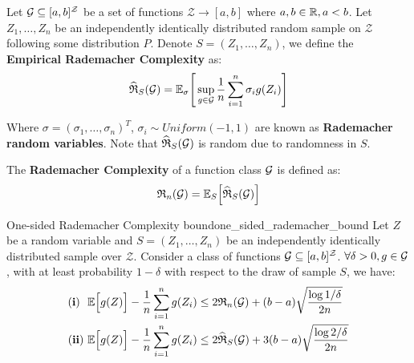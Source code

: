 \begin{definition}
    Let $\mathcal{G}\subseteq[a,b]^{\mathcal{Z}}$ be a set of functions $\mathcal{Z} \to [a, b]$ where $a,b\in\mathbb{R}, a < b$. Let $Z_1, \dots, Z_n$ be an independently identically distributed random sample on $\mathcal{Z}$ following some distribution $P$. Denote $S=(Z_1, \dots, Z_n)$, we define the \textbf{Empirical Rademacher Complexity} as:
    \begin{align*}
        \widehat{\mathfrak{R}}_S(\mathcal{G}) = \mathbb{E}_\sigma\Bigg[ 
            \sup_{g\in\mathcal{G}} \frac{1}{n}\sum_{i=1}^n \sigma_i g(Z_i)
         \Bigg]
    \end{align*}

    \noindent Where $\sigma=(\sigma_1, \dots, \sigma_n)^T$, $\sigma_i\sim Uniform(-1, 1)$ are known as \textbf{Rademacher random variables}. Note that $\widehat{\mathfrak{R}}_S(\mathcal{G})$ is random due to randomness in $S$.
\end{definition}

\begin{definition}
    The \textbf{Rademacher Complexity} of a function class $\mathcal{G}$ is defined as:
    \begin{align*}
        \mathfrak{R}_n(\mathcal{G}) = \mathbb{E}_S\Big[  \widehat{\mathfrak{R}}_S(\mathcal{G})  \Big]
    \end{align*}
\end{definition}

\begin{theorem}{One-sided Rademacher Complexity bound}{one_sided_rademacher_bound}
    Let $Z$ be a random variable and $S=(Z_1, \dots, Z_n)$ be an independently identically distributed sample over $\mathcal{Z}$. Consider a class of functions $\mathcal{G}\subseteq [a,b]^\mathcal{Z}$. $\forall \delta > 0, g\in\mathcal{G}$, with at least probability $1-\delta$ with respect to the draw of sample $S$, we have:
    \begin{align*}
        {\bf (i)} \ \ \mathbb{E}\Big[ g(Z) \Big] - \frac{1}{n} \sum_{i=1}^n g(Z_i) &\le 2\mathfrak{R}_n(\mathcal{G}) + (b-a)\sqrt{\frac{\log1/\delta}{2n}} \\
        {\bf (ii)} \  \mathbb{E}\Big[ g(Z) \Big] - \frac{1}{n} \sum_{i=1}^n g(Z_i) &\le 2\widehat{\mathfrak{R}}_S(\mathcal{G}) + 3(b-a)\sqrt{\frac{\log2/\delta}{2n}}
    \end{align*}
\end{theorem}

